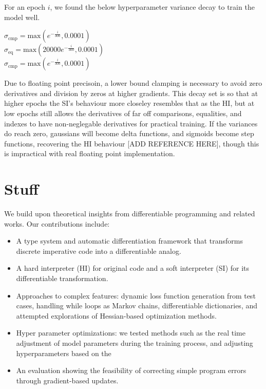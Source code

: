 \documentclass{article}
\begin{document}
For an epoch $i$, we found the below hyperparameter variance decay to train the model well. 
\begin{center}
  $\sigma_{\text{cmp}} = \text{max}(e^{-\frac{i}{300}}, 0.0001)$\\
  $\sigma_{\text{eq}} = \text{max}(20000e^{-\frac{i}{300}}, 0.0001)$\\
  $\sigma_{\text{cmp}} = \text{max}(e^{-\frac{i}{300}}, 0.0001)$\\
\end{center}
Due to floating point precisoin, a lower bound clamping is necessary to avoid zero derivatives and division by zeros at higher gradients. This decay set is so that at higher epochs the SI's behaviour more closeley resembles that as the HI, but at low epochs still allows the derivatives of far off comparisons, equalities, and indexes to have non-neglegable derivatives for practical training. If the variances do reach zero, gaussians will become delta functions, and sigmoids become step functions, recovering the HI behaviour [ADD REFERENCE HERE], though this is impractical with real floating point implementation.

\section*{Stuff}

We build upon theoretical insights from differentiable programming \cite{blondel2024elementsdifferentiableprogramming, DBLP:journals/corr/abs-1907-07587, vandemeulebroucke2018myia} and related works. Our contributions include:
\begin{itemize}
\item A type system and automatic differentiation framework that transforms discrete imperative code into a differentiable analog.
\item A hard interpreter (HI) for original code and a soft interpreter (SI) for its differentiable transformation.
    \item Approaches to complex features: dynamic loss function generation from test cases, handling while loops as Markov chains, differentiable dictionaries, and attempted explorations of Hessian-based optimization methods.
    \item Hyper parameter optimizations: we tested methods such as the real time adjustment of model parameters during the training process, and adjusting hyperparameters based on the 
    \item An evaluation showing the feasibility of correcting simple program errors through gradient-based updates.
\end{itemize}
\end{document}
